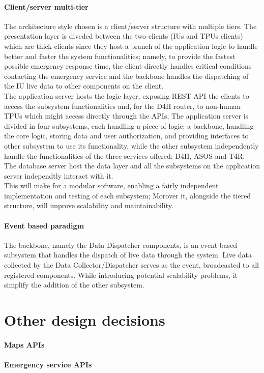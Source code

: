 \paragraph{Client/server multi-tier}
The architecture style chosen is a client/server structure with multiple tiers. The presentation layer is diveded between the two clients (IUs and TPUs clients) which are thick clients since they host a branch of the application logic to handle better and faster the system functionalities; namely, to provide the fastest possible emergency response time, the client directly handles critical conditions contacting the emergency service and the backbone handles the dispatching of the IU live data to other components on the client. \\
The application server hosts the logic layer, exposing REST API the clients to access the subsystem functionalities and, for the D4H router, to non-human TPUs which might access directly through the APIs; The application server is divided in four subsystems, each handling a piece of logic: a backbone, handling the core logic, storing data and user authorization, and providing interfaces to other subsystem to use its functionality, while the other subsystem independently handle the functionalities of the three services offered: D4H, ASOS and T4R. \\
The database server host the data layer and all the subsystems on the application server independtly interact with it.
\\
This will make for a modular software, enabling a fairly independent implementation and testing of each subsystem; Morover it, alongside the tiered structure, will improve scalability and maintainability.

\paragraph{Event based paradigm}
The backbone, namely the Data Dispatcher components, is an event-based subsystem that handles the dispatch of live data through the system. Live data collected by the Data Collector/Dispatcher serves as the event, broadcasted to all registered components. While introducing potential scalability problems, it simplify the addition of the other subsystem.
\section{Other design decisions}
\paragraph{Maps APIs}
\paragraph{Emergency service APIs}